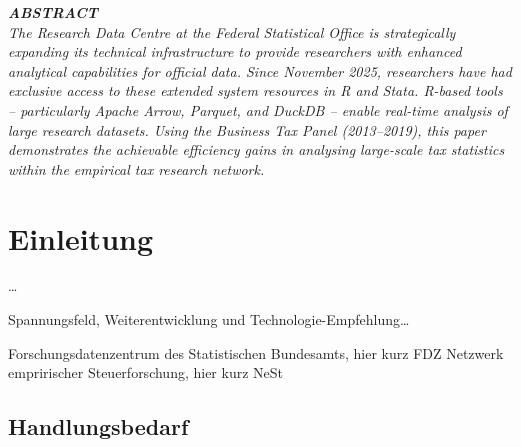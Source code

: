 \documentclass[
  german,
  10pt,
  twoside]{article}
\renewcommand*\contentsname{Inhaltsverzeichnis}
\newcommand\contentsname{Inhaltsverzeichnis}
\begin{document}
\begin{titlepage}
\begin{minipage}[t]{11.8cm}
\vspace{0.3cm}

{\itshape\color{wistaDarkGray}\bfseries\MakeUppercase{Abstract}}\\[0.15cm]
\small\itshape
The Research Data Centre at the Federal Statistical Office is strategically expanding its technical infrastructure to provide researchers with enhanced analytical capabilities for official data. Since November 2025, researchers have had exclusive access to these extended system resources in R and Stata. R-based tools -- particularly Apache Arrow, Parquet, and DuckDB -- enable real-time analysis of large research datasets. Using the Business Tax Panel (2013--2019), this paper demonstrates the achievable efficiency gains in analysing large-scale tax statistics within the empirical tax research network.

\end{minipage}

\vfill

\vspace{0.5cm}
\noindent{}

\end{titlepage}

\pagestyle{fancy}

\renewcommand*\contentsname{Inhaltsverzeichnis}
{
\hypersetup{linkcolor=}
\setcounter{tocdepth}{3}
\tableofcontents
}

\clearpage
\twocolumn

\section{Einleitung}\label{sec-einleitung}

\ldots{}

Spannungsfeld, Weiterentwicklung und Technologie-Empfehlung\ldots{}

Forschungsdatenzentrum des Statistischen Bundesamts, hier kurz FDZ
Netzwerk empririscher Steuerforschung, hier kurz NeSt

\subsection{Handlungsbedarf}\label{handlungsbedarf}
\end{document}
